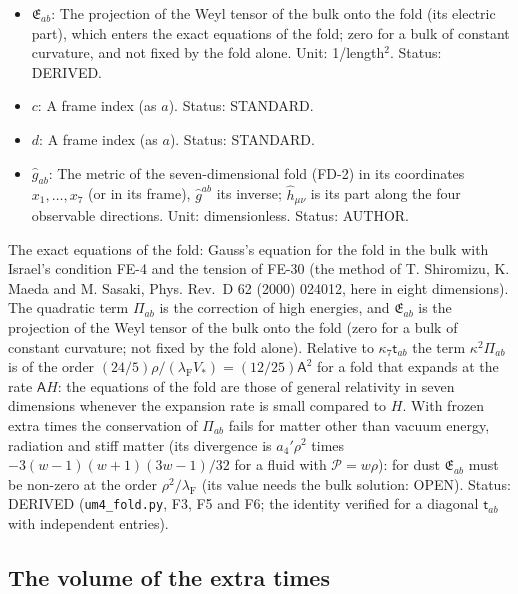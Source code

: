 \documentclass[
  10pt,
]{article}
\begin{document}
\begin{itemize}
  of the fold, quadratic in the matter \(\mathsf{t}_{ab}\) of the fold.
  Unit: GeV\(^{14}\). Status: DERIVED.
\item
  \(\mathfrak{E}_{ab}\): The projection of the Weyl tensor of the bulk
  onto the fold (its electric part), which enters the exact equations of
  the fold; zero for a bulk of constant curvature, and not fixed by the
  fold alone. Unit: 1/length\(^2\). Status: DERIVED.
\item
  \(c\): A frame index (as \(a\)). Status: STANDARD.
\item
  \(d\): A frame index (as \(a\)). Status: STANDARD.
\item
  \(\hat g_{ab}\): The metric of the seven-dimensional fold (FD-2) in
  its coordinates \(x_1, \dots, x_7\) (or in its frame), \(\hat g^{ab}\)
  its inverse; \(\hat h_{\mu\nu}\) is its part along the four observable
  directions. Unit: dimensionless. Status: AUTHOR.
\end{itemize}

The exact equations of the fold: Gauss's equation for the fold in the
bulk with Israel's condition FE-4 and the tension of FE-30 (the method
of T. Shiromizu, K. Maeda and M. Sasaki, Phys. Rev.~D 62 (2000) 024012,
here in eight dimensions). The quadratic term \(\Pi_{ab}\) is the
correction of high energies, and \(\mathfrak{E}_{ab}\) is the projection
of the Weyl tensor of the bulk onto the fold (zero for a bulk of
constant curvature; not fixed by the fold alone). Relative to
\(\kappa_7\mathsf{t}_{ab}\) the term \(\kappa^2\Pi_{ab}\) is of the
order \((24/5)\rho/(\lambda_{\mathrm{F}}V_*) = (12/25)\mathsf{A}^2\) for
a fold that expands at the rate \(\mathsf{A}H\): the equations of the
fold are those of general relativity in seven dimensions whenever the
expansion rate is small compared to \(H\). With frozen extra times the
conservation of \(\Pi_{ab}\) fails for matter other than vacuum energy,
radiation and stiff matter (its divergence is \(a_4'\rho^2\) times
\(-3(w - 1)(w + 1)(3w - 1)/32\) for a fluid with
\(\mathcal{P} = w\rho\)): for dust \(\mathfrak{E}_{ab}\) must be
non-zero at the order \(\rho^2/\lambda_{\mathrm{F}}\) (its value needs
the bulk solution: OPEN). Status: DERIVED (\texttt{um4\_fold.py}, F3, F5
and F6; the identity verified for a diagonal \(\mathsf{t}_{ab}\) with
independent entries).

\hypertarget{the-volume-of-the-extra-times}{%
\subsection{The volume of the extra
times}\label{the-volume-of-the-extra-times}}
\end{document}
